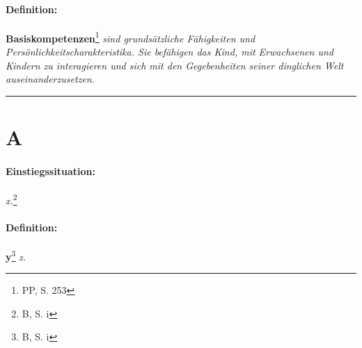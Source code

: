 \documentclass[12pt,a4paper]{article}
\newcommand\einstieg{\paragraph{\color{amethyst} {Einstiegssituation:}}}
\newcommand\definition{\paragraph{\color{red} {Definition:}}}
\begin{document}
\definition {\bf Basiskompetenzen}\footnote{\label{Basiskompetenzen} PP, S. 253}
 \sl{sind grundsätzliche Fähigkeiten und
  Per\-sön\-lich\-keits\-charakteristika. Sie befähigen das Kind, mit Erwachsenen und
  Kindern zu interagieren und sich mit den Gegebenheiten seiner dinglichen Welt
  auseinanderzusetzen. }

\vskip 16pt \hrule
{ \color{coolblack}
  \section{A} }

\einstieg {\sl x.}\footnote{\label{F-x} B, S. i}

\definition {\bf y}\footnote{\label{y} B, S. i}
 \sl{z.}

\printindex
\end{document}
